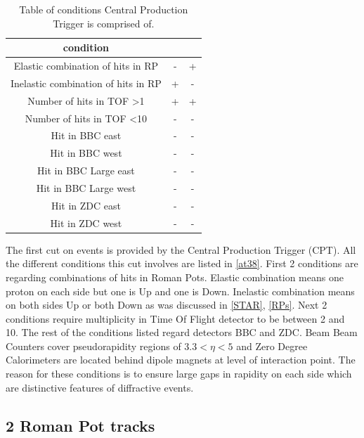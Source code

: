 \FloatBarrier
\begin{table}[ht]
    \centering
    \begin{tabular}{c|c|c}
    
        condition &  & \\ \hline
       Elastic combination of hits in RP & - & + \\ 
       Inelastic combination of hits in RP & + & - \\
       Number of hits in TOF >1 & + & + \\
       Number of hits in TOF <10 & - & - \\
       Hit in BBC east & - & - \\
       Hit in BBC west & - & - \\
       Hit in BBC Large east & - & -\\
       Hit in BBC Large west & - & - \\
       Hit in ZDC east & - & -\\
       Hit in ZDC west & - & - \\
    \end{tabular}
    \caption[Table of conditions for Central Production Trigger]{Table of conditions Central Production Trigger is comprised of.}
    \label{at38}
\end{table}
\FloatBarrier
The first cut on events is provided by the Central Production Trigger (CPT). All the different conditions this cut involves are listed in \autoref{at38}. First 2 conditions are regarding combinations of hits in Roman Pots. Elastic combination means one proton on each side but one is Up and one is Down. Inelastic combination means on both sides Up or both Down as was discussed in \autoref{STAR}, \autoref{RPs}. Next 2 conditions require  multiplicity in Time Of Flight detector to be between 2 and 10. The rest of the conditions listed regard detectors BBC and ZDC. Beam Beam Counters cover pseudorapidity regions of $3.3<\eta<5$ and Zero Degree Calorimeters are located behind dipole magnets at level of interaction point. The reason for these conditions is to ensure large gaps in rapidity on each side which are distinctive features of diffractive events.
\subsection{2 Roman Pot tracks}

